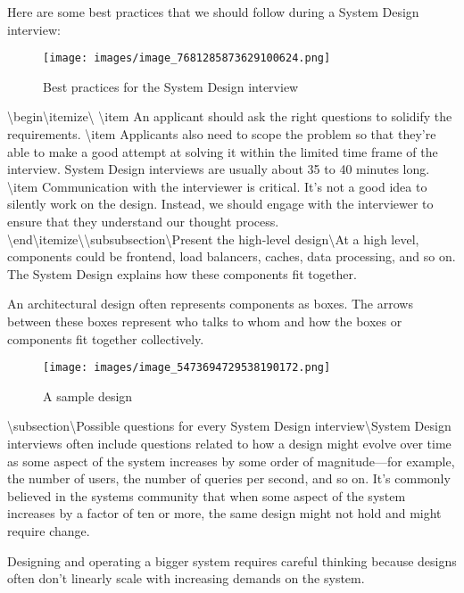 Here are some best practices that we should follow during a System Design interview:

\begin{figure}[htbp]
    \centering
    \texttt{[image: images/image\_7681285873629100624.png]}
    \caption{Best practices for the System Design interview}
\end{figure}

\textbackslash{}begin\textbackslash{}{itemize\textbackslash{}}
\textbackslash{}item An applicant should ask the right questions to solidify the requirements.
\textbackslash{}item Applicants also need to scope the problem so that they’re able to make a good attempt at solving it within the limited time frame of the interview. System Design interviews are usually about 35 to 40 minutes long.
\textbackslash{}item Communication with the interviewer is critical. It’s not a good idea to silently work on the design. Instead, we should engage with the interviewer to ensure that they understand our thought process.
\textbackslash{}end\textbackslash{}{itemize\textbackslash{}}\textbackslash{}subsubsection\textbackslash{}{Present the high-level design\textbackslash{}}At a high level, components could be frontend, load balancers, caches, data processing, and so on. The System Design explains how these components fit together.

An architectural design often represents components as boxes. The arrows between these boxes represent who talks to whom and how the boxes or components fit together collectively.

\begin{figure}[htbp]
    \centering
    \texttt{[image: images/image\_5473694729538190172.png]}
    \caption{A sample design}
\end{figure}

\textbackslash{}subsection\textbackslash{}{Possible questions for every System Design interview\textbackslash{}}System Design interviews often include questions related to how a design might evolve over time as some aspect of the system increases by some order of magnitude—for example, the number of users, the number of queries per second, and so on. It’s commonly believed in the systems community that when some aspect of the system increases by a factor of ten or more, the same design might not hold and might require change.

Designing and operating a bigger system requires careful thinking because designs often don’t linearly scale with increasing demands on the system.

